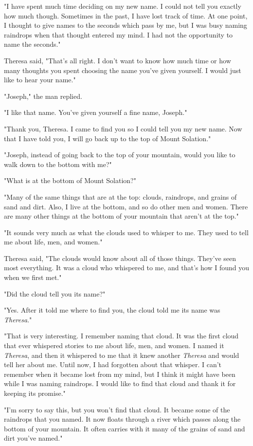 "I have spent much time deciding on my new name. I could not tell you exactly how much though. Sometimes in the past, I have lost track of time. At one point, I thought to give names to the seconds which pass by me, but I was busy naming raindrops when that thought entered my mind. I had not the opportunity to name the seconds."

Theresa said, "That's all right. I don't want to know how much time or how many thoughts you spent choosing the name you've given yourself. I would just like to hear your name."

"Joseph," the man replied.

"I like that name. You've given yourself a fine name, Joseph."

"Thank you, Theresa. I came to find you so I could tell you my new name. Now that I have told you, I will go back up to the top of Mount Solation."

"Joseph, instead of going back to the top of your mountain, would you like to walk down to the bottom with me?"

"What is at the bottom of Mount Solation?"

"Many of the same things that are at the top: clouds, raindrops, and grains of sand and dirt. Also, I live at the bottom, and so do other men and women. There are many other things at the bottom of your mountain that aren't at the top."

"It sounds very much as what the clouds used to whisper to me. They used to tell me about life, men, and women."

Theresa said, "The clouds would know about all of those things. They've seen most everything. It was a cloud who whispered to me, and that's how I found you when we first met."

"Did the cloud tell you its name?"

"Yes. After it told me where to find you, the cloud told me its name was \textit{Theresa}."

"That is very interesting. I remember naming that cloud. It was the first cloud that ever whispered stories to me about life, men, and women. I named it \textit{Theresa}, and then it whispered to me that it knew another \textit{Theresa} and would tell her about me. Until now, I had forgotten about that whisper. I can't remember when it became lost from my mind, but I think it might have been while I was naming raindrops. I would like to find that cloud and thank it for keeping its promise."

"I'm sorry to say this, but you won't find that cloud. It became some of the raindrops that you named. It now floats through a river which passes along the bottom of your mountain. It often carries with it many of the grains of sand and dirt you've named."

